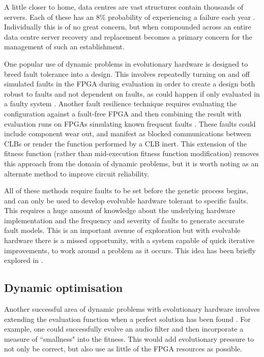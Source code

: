 A little closer to home, data centres are vast structures contain thousands of servers.
Each of these has an 8\% probability of experiencing a failure each year
 \cite{Vishwanath:2010:CCC:1807128.1807161}.
Individually this is of no great concern, but when compounded across an entire data centre
server recovery and replacement becomes a primary concern for the management of
such an establishment.

One popular use of dynamic problems in evolutionary hardware is designed to breed
fault tolerance into a
design. This involves repeatedly turning on and off simulated faults in the FPGA during
evaluation in order to
create a design both robust to faults and not dependent on faults, as could happen if
only evaluated in a faulty system \cite{651463}. Another fault resilience
technique requires evaluating the configuration
against a fault-free FPGA and then combining the result with evaluation runs on FPGAs
simulating known frequent faults \cite{651463}\cite{Keymeulen2000}. These faults could include component
wear out, and manifest as blocked communications between CLBs or render the function
performed by a CLB inert. This extension of the fitness function (rather than
mid-execution fitness function modification) removes this approach from the domain of dynamic problems,
but it is worth noting as an alternate method to improve circuit reliability.

All of these methods require faults to be set before the genetic process begins, and can only be used to
develop evolvable hardware tolerant to specific faults. This requires a huge amount of knowledge
about the underlying hardware implementation and the frequency and severity of faults to generate
accurate fault models. This
is an important avenue of exploration but with evolvable hardware there is a missed
opportunity, with a system capable of quick iterative improvements, to work around
a problem as it occurs. This idea has been briefly explored in \cite{10.1007/3-540-61093-6_6}.

\subsection{Dynamic optimisation}
Another successful area of dynamic problems with evolutionary hardware involves
extending the evaluation function when a perfect solution has been found \cite{785435}. For example,
one could successfully evolve an audio filter and then incorporate a measure of ``smallness"
into the fitness. This would add evolutionary pressure to not only be correct, but also
use as little of the FPGA resources as possible.

